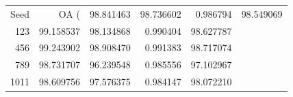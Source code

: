 \begin{tabular}{rrrrr}
\toprule
Seed & OA (%
 & 98.841463 & 98.736602 & 0.986794 & 98.549069 \\
123 & 99.158537 & 98.134868 & 0.990404 & 98.627787 \\
456 & 99.243902 & 98.908470 & 0.991383 & 98.717074 \\
789 & 98.731707 & 96.239548 & 0.985556 & 97.102967 \\
1011 & 98.609756 & 97.576375 & 0.984147 & 98.072210 \\
\bottomrule
\end{tabular}
